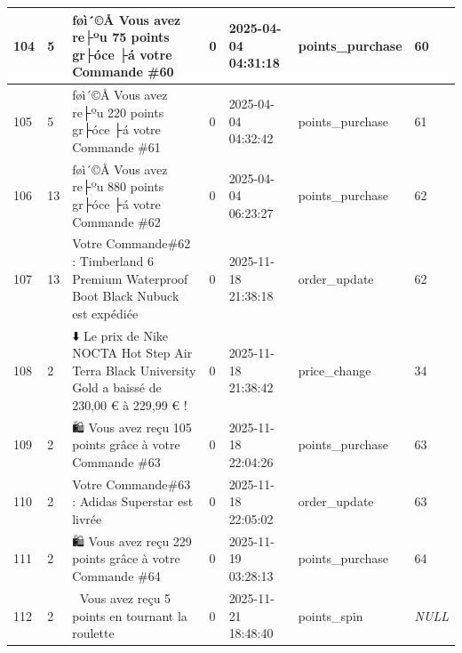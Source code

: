 \begin{longtable}{|l|l|l|l|l|l|l|}
104 & 5 & ­ƒøì´©Å Vous avez re├ºu 75 points gr├óce ├á votre Commande \#60 & 0 & 2025-04-04 04:31:18 & points\_purchase & 60 \\ \hline 
105 & 5 & ­ƒøì´©Å Vous avez re├ºu 220 points gr├óce ├á votre Commande \#61 & 0 & 2025-04-04 04:32:42 & points\_purchase & 61 \\ \hline 
106 & 13 & ­ƒøì´©Å Vous avez re├ºu 880 points gr├óce ├á votre Commande \#62 & 0 & 2025-04-04 06:23:27 & points\_purchase & 62 \\ \hline 
107 & 13 & Votre Commande\#62 : Timberland 6 Premium Waterproof Boot Black Nubuck est expédiée & 0 & 2025-11-18 21:38:18 & order\_update & 62 \\ \hline 
108 & 2 & ⬇️ Le prix de Nike NOCTA Hot Step Air Terra Black University Gold a baissé de 230,00 € à 229,99 € ! & 0 & 2025-11-18 21:38:42 & price\_change & 34 \\ \hline 
109 & 2 & 🛍️ Vous avez reçu 105 points grâce à votre Commande \#63 & 0 & 2025-11-18 22:04:26 & points\_purchase & 63 \\ \hline 
110 & 2 & Votre Commande\#63 : Adidas Superstar est livrée & 0 & 2025-11-18 22:05:02 & order\_update & 63 \\ \hline 
111 & 2 & 🛍️ Vous avez reçu 229 points grâce à votre Commande \#64 & 0 & 2025-11-19 03:28:13 & points\_purchase & 64 \\ \hline 
112 & 2 & 🛞 Vous avez reçu 5 points en tournant la roulette & 0 & 2025-11-21 18:48:40 & points\_spin & \textit{NULL} \\ \hline 
 \end{longtable}

